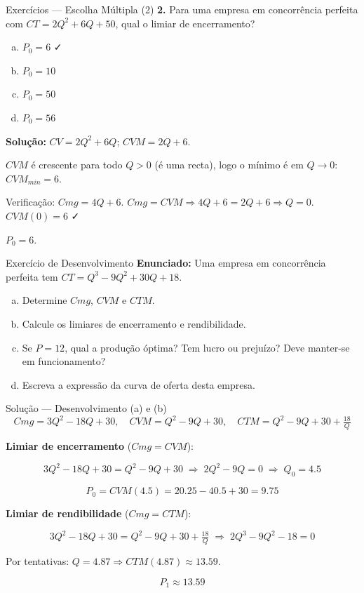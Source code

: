 \documentclass[
  ignorenonframetext,
  handout]{beamer}
\providecommand{\tightlist}{%
  \setlength{\itemsep}{0pt}\setlength{\parskip}{0pt}}
\begin{document}
\begin{frame}{Exercícios --- Escolha Múltipla (2)}
\label{exercuxedcios-escolha-muxfaltipla-2}
\textbf{2.} Para uma empresa em concorrência perfeita com
\(CT = 2Q^2 + 6Q + 50\), qual o limiar de encerramento?

\begin{enumerate}
[a)]
\tightlist
\item
  \(P_0 = 6\) ✓
\item
  \(P_0 = 10\)
\item
  \(P_0 = 50\)
\item
  \(P_0 = 56\)
\end{enumerate}

\textbf{Solução:} \(CV = 2Q^2 + 6Q\); \(CVM = 2Q + 6\).

\(CVM\) é crescente para todo \(Q > 0\) (é uma recta), logo o mínimo é
em \(Q \to 0\): \(CVM_{min} = 6\).

Verificação: \(Cmg = 4Q + 6\).
\(Cmg = CVM \Rightarrow 4Q + 6 = 2Q + 6 \Rightarrow Q = 0\).
\(CVM(0) = 6\) ✓

\(P_0 = 6\).
\end{frame}

\begin{frame}{Exercício de Desenvolvimento}
\label{exercuxedcio-de-desenvolvimento}
\textbf{Enunciado:} Uma empresa em concorrência perfeita tem
\(CT = Q^3 - 9Q^2 + 30Q + 18\).

\begin{enumerate}
[a)]
\item
  Determine \(Cmg\), \(CVM\) e \(CTM\).
\item
  Calcule os limiares de encerramento e rendibilidade.
\item
  Se \(P = 12\), qual a produção óptima? Tem lucro ou prejuízo? Deve
  manter-se em funcionamento?
\item
  Escreva a expressão da curva de oferta desta empresa.
\end{enumerate}
\end{frame}

\begin{frame}{Solução --- Desenvolvimento (a) e (b)}
\label{soluuxe7uxe3o-desenvolvimento-a-e-b}
\[Cmg = 3Q^2 - 18Q + 30, \quad CVM = Q^2 - 9Q + 30, \quad CTM = Q^2 - 9Q + 30 + \tfrac{18}{Q}\]

\textbf{Limiar de encerramento} (\(Cmg = CVM\)):

\[3Q^2 - 18Q + 30 = Q^2 - 9Q + 30 \;\Rightarrow\; 2Q^2 - 9Q = 0 \;\Rightarrow\; Q_0 = 4.5\]

\[P_0 = CVM(4.5) = 20.25 - 40.5 + 30 = \mathbf{9.75}\]

\textbf{Limiar de rendibilidade} (\(Cmg = CTM\)):

\[3Q^2 - 18Q + 30 = Q^2 - 9Q + 30 + \tfrac{18}{Q} \;\Rightarrow\; 2Q^3 - 9Q^2 - 18 = 0\]

Por tentativas: \(Q = 4.87 \Rightarrow CTM(4.87) \approx 13.59\).

\[P_1 \approx \mathbf{13.59}\]
\end{frame}
\end{document}
